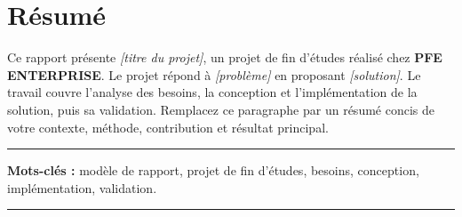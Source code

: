 \chapter*{R\'esum\'e}
\begingroup{}
Ce rapport pr\'esente \textit{[titre du projet]}, un projet de fin d'\'etudes r\'ealis\'e chez \textbf{PFE ENTERPRISE}. Le projet r\'epond \`a \textit{[probl\`eme]} en proposant \textit{[solution]}. Le travail couvre l'analyse des besoins, la conception et l'impl\'ementation de la solution, puis sa validation. Remplacez ce paragraphe par un r\'esum\'e concis de votre contexte, m\'ethode, contribution et r\'esultat principal.

\par\medskip
\noindent\rule{\textwidth}{0.5pt}\par\smallskip
{\textbf{Mots-cl\'es :}} mod\`ele de rapport, projet de fin d'\'etudes, besoins, conception, impl\'ementation, validation.\par\smallskip
\noindent\rule{\textwidth}{0.5pt}
\endgroup
